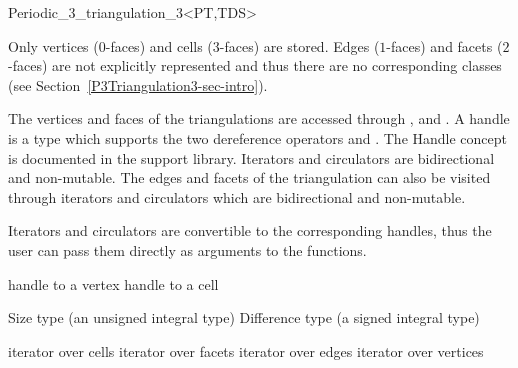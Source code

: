 \begin{ccRefClass}{Periodic_3_triangulation_3<PT,TDS>}
\ccGlue
{}
\ccGlue
{}
\ccGlue
{}

Only vertices ($0$-faces) and cells ($3$-faces) are stored. Edges
($1$-faces) and facets ($2$-faces) are not explicitly represented and
thus there are no corresponding classes (see
Section~\ref{P3Triangulation3-sec-intro}).

\ccGlue
{}
\ccGlue
{}
\ccGlue
{}

The vertices and faces of the triangulations are accessed through
,  and . 
A handle is a type which supports the two dereference operators
 and .  The Handle concept is
documented in the support library.
Iterators and circulators are bidirectional and non-mutable.
The edges and facets of the triangulation can also be visited through
iterators and circulators which are bidirectional and non-mutable.

Iterators and circulators are convertible to the corresponding handles, thus
the user can pass them directly as arguments to the functions.

\ccThreeToTwo

{handle to a vertex}
\ccGlue
{}
{handle to a cell}

{Size type (an unsigned integral type)}
\ccGlue
{}
{Difference type (a signed integral type)}

{iterator over cells}
\ccGlue
{}
{iterator over facets}
\ccGlue
{}
{iterator over edges}
\ccGlue
{}
{iterator over vertices}


\end{ccRefClass}
